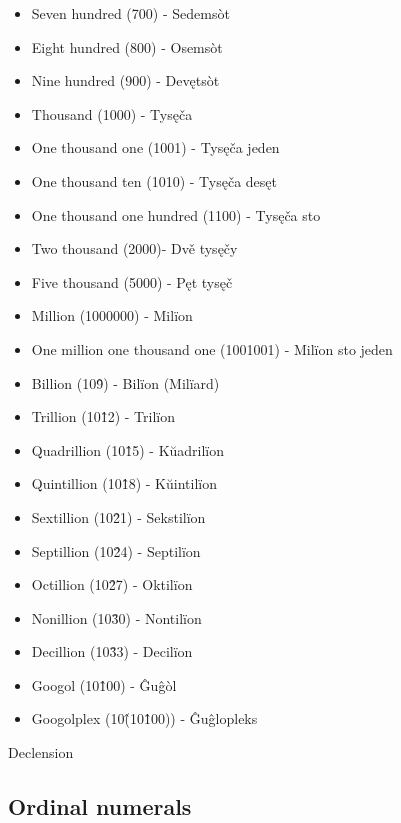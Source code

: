 \begin{itemize}
	\item Seven hundred (700) - Sedemsòt
	\item Eight hundred (800) - Osemsòt
	\item Nine hundred (900) - Devętsòt
	\item Thousand (1000) - Tysęča
	\item One thousand one (1001) - Tysęča jeden
	\item One thousand ten (1010) - Tysęča desęt
	\item One thousand one hundred (1100) - Tysęča sto
	\item Two thousand (2000)- Dvě tysęčy
	\item Five thousand (5000) - Pęt tysęč
	\item Million (1000000) - Milïon
	\item One million one thousand one (1001001) - Milïon sto jeden
	\item Billion (10\^9) - Bilïon (Milïard)
	\item Trillion (10\^12) - Trilïon
	\item Quadrillion (10\^15) - Kŭadrilïon
	\item Quintillion (10\^18) - Kŭintilïon
	\item Sextillion (10\^21) - Sekstilïon
	\item Septillion (10\^24) - Septilïon
	\item Octillion (10\^27) - Oktilïon
	\item Nonillion (10\^30) - Nontilïon
	\item Decillion (10\^33) - Decilïon
	\item Googol (10\^100) - Ĝuĝòl
	\item Googolplex (10\^(10\^100)) - Ĝuĝlopleks
\end{itemize}

Declension



\subsection{Ordinal numerals}

